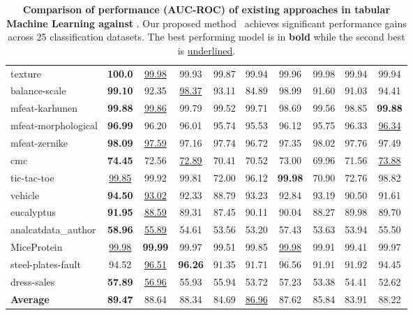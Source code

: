 \begin{table*}[ht]
\begin{tabular}{l|cccccc|ccc}
    texture      & \textbf{100.0} & \underline{99.98} & 99.93 & 99.87 & 99.94 & 99.96 & 99.98 & 99.94 & 99.94 \\
    balance-scale       & \textbf{99.10} & 92.35 & \underline{98.37} & 93.11 & 84.89 & 98.99 & 91.60 & 91.03 & 94.41 \\
    mfeat-karhunen      & \textbf{99.88} & \underline{99.86} & 99.79 & 99.52 & 99.71 & 98.69 & 99.56 & 98.85 & \textbf{99.88} \\
    mfeat-morphological & \textbf{96.99} & 96.20 & 96.01 & 95.74 & 95.53 & 96.12 & 95.75 & 96.33 & \underline{96.34} \\
    mfeat-zernike       & \textbf{98.09} & \underline{97.59} & 97.16 & 97.74 & 96.72 & 97.35 & 98.02 & 97.76 & 97.49 \\
    cmc                 & \textbf{74.45} & 72.56 & \underline{72.89} & 70.41 & 70.52 & 73.00 & 69.96 & 71.56 & \underline{73.88} \\
    tic-tac-toe         & \underline{99.85} & 99.92 & 99.81 & 72.00 & 96.12 & \textbf{99.98} & 70.90 & 72.76 & 98.82 \\
    vehicle             & \textbf{94.50} & \underline{93.02} & 92.33 & 88.79 & 93.23 & 92.84 & 93.19 & 90.50 & 91.61 \\
    eucalyptus          & \textbf{91.95} & \underline{88.59} & 89.31 & 87.45 & 90.11 & 90.04 & 88.27 & 89.98 & 89.70 \\
    analcatdata\_author  & \textbf{58.96} & \underline{55.89} & 54.61 & 53.56 & 53.20 & 57.43 & 53.63 & 53.94 & 55.50 \\
    MiceProtein         & \underline{99.98} & \textbf{99.99} & 99.97 & 99.51 & 99.85 & \underline{99.98} & 99.91 & 99.41 & 99.97 \\
    steel-plates-fault  & 94.52 & \underline{96.51} & \textbf{96.26} & 91.35 & 91.71 & 96.56 & 91.91 & 91.92 & 94.45 \\
    dress-sales         & \textbf{57.89} & \underline{56.96} & 55.93 & 55.94 & 53.72 & 57.23 & 53.38 & 54.41 & 52.62 \\ \midrule
    \textbf{Average} & \textbf{89.47} & 88.64 & 88.34 & 84.69 & \underline{86.96} & 87.62 & 85.84 & 83.91 & 88.22 \\
    \bottomrule
    \end{tabular}
    \caption{\textbf{Comparison of performance (AUC-ROC) of existing approaches in tabular Machine Learning against \tabglm}. Our proposed method \tabglm\ achieves significant performance gains across 25 classification datasets. The best performing model is in \textbf{bold} while the second best is \underline{underlined}.}
    \label{tab:sota_perf_contrast}
\end{table*}
